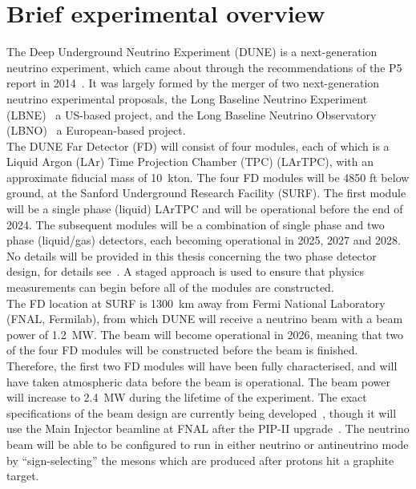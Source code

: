 \section{Brief experimental overview} \label{sec:DUNEOverview}
The Deep Underground Neutrino Experiment (DUNE) is a next-generation neutrino experiment, which came about through the recommendations of the P5 report in 2014~\citep{P5Doc}. It was largely formed by the merger of two next-generation neutrino experimental proposals, the Long Baseline Neutrino Experiment (LBNE)~\citep{LBNE_CDR1, LBNE_CDR2, LBNE_CDR3, LBNE_CDR4, LBNE_CDR5, LBNE_CDR6} a US-based project, and the Long Baseline Neutrino Observatory (LBNO)~\citep{LBNO_EOI} a European-based project. \\

The DUNE Far Detector (FD) will consist of four modules, each of which is a Liquid Argon (LAr) Time Projection Chamber (TPC) (LArTPC), with an approximate fiducial mass of 10~kton. The four FD modules will be 4850 ft below ground, at the Sanford Underground Research Facility (SURF). The first module will be a single phase (liquid) LArTPC and will be operational before the end of 2024. The subsequent modules will be a combination of single phase and two phase (liquid/gas) detectors, each becoming operational in 2025, 2027 and 2028. No details will be provided in this thesis concerning the two phase detector design, for details see~\citep{DUNECDR_V4}. A staged approach is used to ensure that physics measurements can begin before all of the modules are constructed. \\

The FD location at SURF is 1300~km away from Fermi National Laboratory (FNAL, Fermilab), from which DUNE will receive a neutrino beam with a beam power of 1.2~MW. The beam will become operational in 2026, meaning that two of the four FD modules will be constructed before the beam is finished. Therefore, the first two FD modules will have been fully characterised, and will have taken atmospheric data before the beam is operational. The beam power will increase to 2.4~MW during the lifetime of the experiment. The exact specifications of the beam design are currently being developed~\citep{DUNECDR_V3}, though it will use the Main Injector beamline at FNAL after the PIP-II upgrade~\citep{PIP-II}. The neutrino beam will be able to be configured to run in either neutrino or antineutrino mode by ``sign-selecting'' the mesons which are produced after protons hit a graphite target. \\

